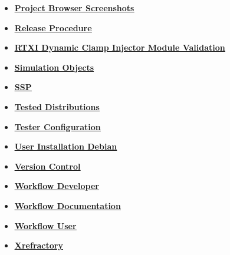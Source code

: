 \documentclass[12pt]{article}
\begin{document}
\begin{itemize}
\item \href{../project-browser-screenshots/project-browser-screenshots.pdf}{\bf \underline{Project Browser Screenshots}}

\item \href{../release-procedure/release-procedure.pdf}{\bf \underline{Release Procedure}}

\item \href{../rtxi-injector-validation/rtxi-injector-validation.pdf}{\bf \underline{RTXI Dynamic Clamp Injector Module Validation}}

\item \href{../simulation-objects/simulation-objects.pdf}{\bf \underline{Simulation Objects}}

\item \href{../ssp/ssp.pdf}{\bf \underline{SSP}}

\item \href{../tested-distributions/tested-distributions.pdf}{\bf \underline{Tested Distributions}}

\item \href{../tester-configuration/tester-configuration.pdf}{\bf \underline{Tester Configuration}}

\item \href{../installation-debian/installation-debian.pdf}{\bf \underline{User Installation Debian}}

\item \href{../version-control/version-control.pdf}{\bf \underline{Version Control}}

\item \href{../workflow-developer/workflow-developer.pdf}{\bf \underline{Workflow Developer}}

\item \href{../workflow-documentation/workflow-documentation.pdf}{\bf \underline{Workflow Documentation}}

\item \href{../workflow-user/workflow-user.pdf}{\bf \underline{Workflow User}}

\item \href{../cxref/cxref.pdf}{\bf \underline{Xrefractory}}


\end{itemize}

\end{document}

